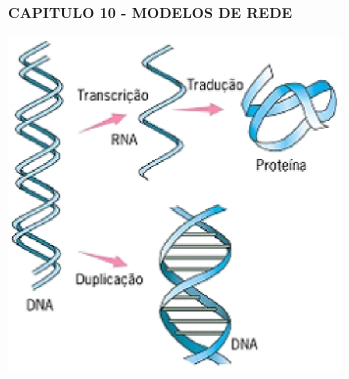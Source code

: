 \documentclass{article}
\begin{document}

\noindent \textbf{CAPITULO 10 - MODELOS DE REDE}

\noindent \textbf{}

\noindent \textbf{}

\textbf{ }
\noindent 

\noindent \textbf{}

\textbf{ } 

\noindent \includegraphics*[width=3.47in, height=3.49in, keepaspectratio=false]{image1} 

\noindent \textbf{}

\textbf{}

\noindent \textbf{}

\noindent \textbf{}

\noindent \textbf{}
\noindent 

\noindent \textbf{}
\end{document}
